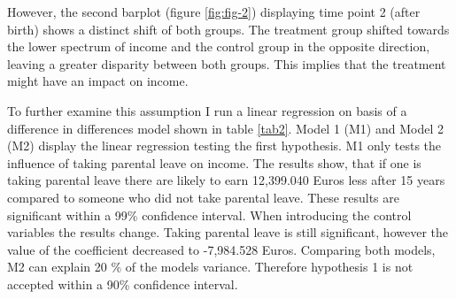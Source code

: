 \documentclass[
  12pt,
]{article}
\begin{document}
However, the second barplot (figure \ref{fig:fig-2}) displaying time point 2 (after birth) shows a distinct shift of both groups. The treatment group shifted towards the lower spectrum of income and the control group in the opposite direction, leaving a greater disparity between both groups. This implies that the treatment might have an impact on income.

To further examine this assumption I run a linear regression on basis of a difference in differences model shown in table \ref{tab2}. Model 1 (M1) and Model 2 (M2) display the linear regression testing the first hypothesis. M1 only tests the influence of taking parental leave on income. The results show, that if one is taking parental leave there are likely to earn 12,399.040 Euros less after 15 years compared to someone who did not take parental leave. These results are significant within a 99\% confidence interval. When introducing the control variables the results change. Taking parental leave is still significant, however the value of the coefficient decreased to -7,984.528 Euros. Comparing both models, M2 can explain 20 \% of the models variance. Therefore hypothesis 1 is not accepted within a 90\% confidence interval.
\end{document}
